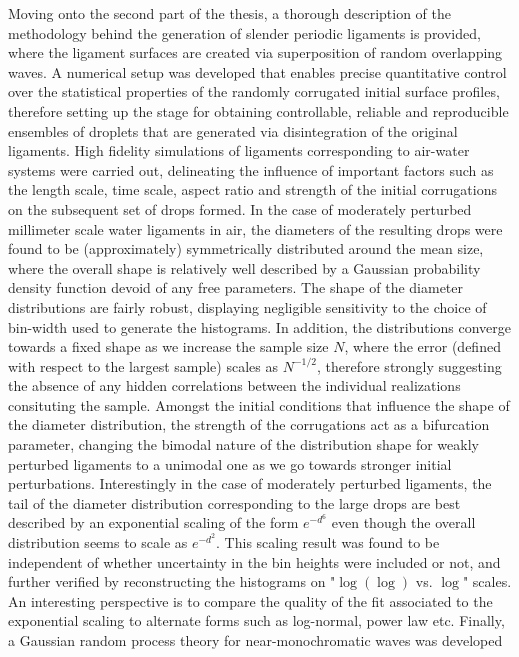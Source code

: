Moving onto the second part of the thesis, a thorough description of the 
methodology behind the generation of slender periodic ligaments is provided, 
where the ligament surfaces are created via superposition of random overlapping waves.
A numerical setup was developed that enables precise quantitative control over the 
statistical properties of the randomly corrugated initial surface profiles, 
therefore setting up the stage for obtaining controllable, reliable and reproducible 
ensembles of droplets that are generated via disintegration of the original ligaments.
High fidelity simulations of ligaments corresponding to air-water systems were carried out,
delineating the influence of important factors such as the length scale, time scale, 
aspect ratio and strength of the initial corrugations on the subsequent set of drops formed.  
In the case of moderately perturbed millimeter scale water ligaments in air, 
the diameters of the resulting drops were found to be (approximately) symmetrically 
distributed around the mean size, where the overall shape is relatively well described by 
a Gaussian probability density function devoid of any free parameters.
The shape of the diameter distributions are fairly robust, displaying negligible sensitivity
to the choice of bin-width used to generate the histograms.
In addition, the distributions converge towards a fixed shape as we increase the sample size $N$, 
where the error (defined with respect to the largest sample) scales as $N^{-1/2}$, therefore strongly 
suggesting the absence of any hidden correlations between the individual realizations consituting the sample. 
Amongst the initial conditions that influence the shape of the diameter distribution, the strength of 
the corrugations act as a bifurcation parameter, changing the bimodal nature of the distribution shape for 
weakly perturbed ligaments to a unimodal one as we go towards stronger initial perturbations. 
Interestingly in the case of moderately perturbed ligaments, the tail of the diameter 
distribution corresponding to the large drops are best described by an exponential scaling of
the form $e^{-d^6}$ even though the overall distribution seems to scale as $e^{-d^2}$. 
This scaling result was found to be independent of whether uncertainty in the bin heights
were included or not, and further verified by reconstructing the histograms on "$\log(\log)$ vs. $\log$" scales.      
An interesting perspective is to compare the quality of the fit associated to 
the exponential scaling to alternate forms such as log-normal, power law etc.  
Finally, a Gaussian random process theory for near-monochromatic waves was developed 
